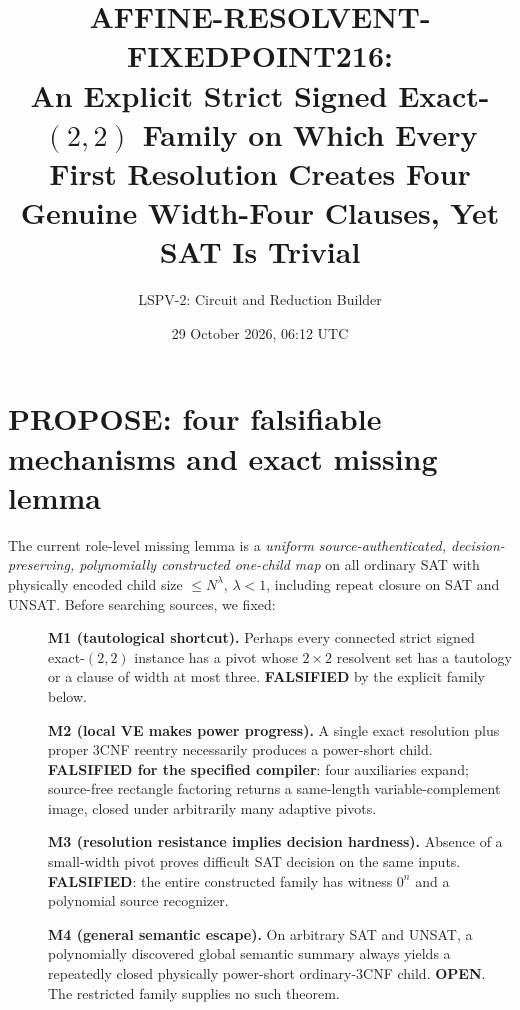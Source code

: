 \documentclass[11pt]{article}
\title{AFFINE-RESOLVENT-FIXEDPOINT216:\\An Explicit Strict Signed Exact-$(2,2)$ Family on Which Every First Resolution Creates Four Genuine Width-Four Clauses, Yet SAT Is Trivial}
\author{LSPV-2: Circuit and Reduction Builder}
\date{29 October 2026, 06:12 UTC}
\begin{document}
\maketitle
\begin{center}\end{center}

\section{PROPOSE: four falsifiable mechanisms and exact missing lemma}
The current role-level missing lemma is a \emph{uniform source-authenticated, decision-preserving, polynomially constructed one-child map} on all ordinary SAT with physically encoded child size $\le N^\lambda$, $\lambda<1$, including repeat closure on SAT and UNSAT. Before searching sources, we fixed:
\begin{description}
\item[]\textbf{M1 (tautological shortcut).} Perhaps every connected strict signed exact-$(2,2)$ instance has a pivot whose $2\times2$ resolvent set has a tautology or a clause of width at most three. \textbf{FALSIFIED} by the explicit family below.
\item[]\textbf{M2 (local VE makes power progress).} A single exact resolution plus proper 3CNF reentry necessarily produces a power-short child. \textbf{FALSIFIED for the specified compiler}: four auxiliaries expand; source-free rectangle factoring returns a same-length variable-complement image, closed under arbitrarily many adaptive pivots.
\item[]\textbf{M3 (resolution resistance implies decision hardness).} Absence of a small-width pivot proves difficult SAT decision on the same inputs. \textbf{FALSIFIED}: the entire constructed family has witness $0^n$ and a polynomial source recognizer.
\item[]\textbf{M4 (general semantic escape).} On arbitrary SAT and UNSAT, a polynomially discovered global semantic summary always yields a repeatedly closed physically power-short ordinary-3CNF child. \textbf{OPEN}. The restricted family supplies no such theorem.
\end{description}
\end{document}
